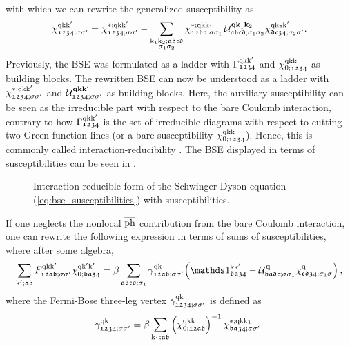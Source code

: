 \documentclass[../../main.tex]{subfiles}
\begin{document}
with which we can rewrite the generalized susceptibility as
\begin{align}\label{eq:bse_susceptibilities}
	\chi_{\mathfrak{1234};\sigma\sigma'}^{\text{q}\text{k}\text{k}'}=\chi_{\mathfrak{1234};\sigma\sigma'}^{*;\text{q}\text{k}\text{k}'}-\sum_{\substack{\text{k}_1\text{k}_2;\mathfrak{abcd}\\\sigma_1\sigma_2}}\chi_{\mathfrak{12ba};\sigma\sigma_1}^{*;\text{q}\text{k}\text{k}_1}\, \mathcal{U}^{\textbf{qk}_1\textbf{k}_2}_{\mathfrak{abcd};\sigma_1\sigma_2} \chi_{\mathfrak{dc34};\sigma_2\sigma'}^{\text{q}\text{k}_2\text{k}'}.
\end{align}
Previously, the BSE was formulated as a ladder with $\Gamma_{\mathfrak{1234}}^{\text{q}\text{k}\text{k}'}$ and $\chi_{0;\mathfrak{1234}}^{\text{q}\text{k}\text{k}}$ as building blocks. The rewritten BSE can now be understood as a ladder with $\chi_{\mathfrak{1234};\sigma\sigma'}^{*;\text{q}\text{k}\text{k}'}$ and $\mathcal{U}^{\textbf{qkk}'}_{\mathfrak{1234};\sigma\sigma'}$ as building blocks. Here, the auxiliary susceptibility can be seen as the irreducible part with respect to the bare Coulomb interaction, contrary to how $\Gamma_{\mathfrak{1234}}^{\text{q}\text{k}\text{k}'}$ is the set of irreducible diagrams with respect to cutting two Green function lines (or a bare susceptibility $\chi_{0;\mathfrak{1234}}^{\text{q}\text{k}\text{k}}$). Hence, this is commonly called interaction-reducibility \cite{Krien2019a}. The BSE displayed in terms of susceptibilities can be seen in .
\begin{figure}[ht!]
	\centering
  	
  	\caption{Interaction-reducible form of the Schwinger-Dyson equation (\ref{eq:bse_susceptibilities}) with susceptibilities.}
  	\label{fig:bse_susceptibilities}
\end{figure}
If one neglects the nonlocal $\overline{\text{ph}}$ contribution from the bare Coulomb interaction, one can rewrite the following expression in terms of sums of susceptibilities, where after some algebra,
\begin{align}
	\sum_{\kp;\mathfrak{ab}}F_{\mathfrak{12ab};\ss'}^{\q\k\kp}\chi_{0;\mathfrak{ba34}}^{\q\kp\kp}=\beta\sum_{\mathfrak{abcd};\sigma_1}\gamma_{\mathfrak{12ab};\ss'}^{\q\k}\!\left (\unity_{\mathfrak{ba34}}^{\k\kp}-\mathcal{U}^{\vv{q}}_{\mathfrak{badc};\ss_1}\chi^{\q}_{\mathfrak{cd34};\sigma_1\sigma}\right ),
\end{align}
where the Fermi-Bose three-leg vertex $\gamma_{\mathfrak{1234};\sigma\sigma'}^{\text{q}\text{k}}$ is defined as
\begin{align}\label{eq:vrg}
	\gamma_{\mathfrak{1234};\sigma\sigma'}^{\text{q}\text{k}} = \beta \sum_{\text{k}_1;\mathfrak{ab}}\left (\chi_{0;\mathfrak{12ab}}^{\text{q}\text{k}\text{k}}\right )^{-1}\chi_{\mathfrak{ba34};\sigma\sigma'}^{*;\text{q}\text{k}\text{k}_1}.
\end{align}
\end{document}
